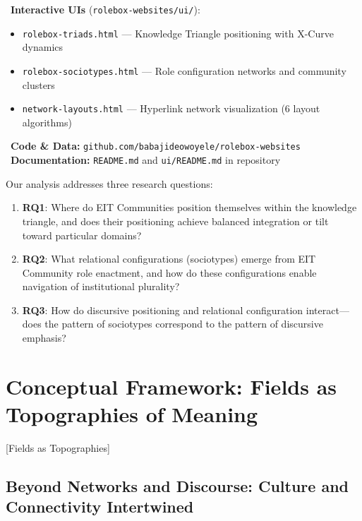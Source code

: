 \documentclass[../main.tex]{subfiles}
\begin{document}
\begin{replicationbox}
\faLaptopCode\ \textbf{Interactive UIs} (\texttt{rolebox-websites/ui/}):
\begin{itemize}[leftmargin=*, itemsep=0.1em]
    \item \texttt{rolebox-triads.html} --- Knowledge Triangle positioning with X-Curve dynamics
    \item \texttt{rolebox-sociotypes.html} --- Role configuration networks and community clusters
    \item \texttt{network-layouts.html} --- Hyperlink network visualization (6 layout algorithms)
\end{itemize}
\faGithub\ \textbf{Code \& Data:} \texttt{github.com/babajideowoyele/rolebox-websites}\\
\faBook\ \textbf{Documentation:} \texttt{README.md} and \texttt{ui/README.md} in repository
\end{replicationbox}

Our analysis addresses three research questions:

\begin{enumerate}
    \item \textbf{RQ1}: Where do EIT Communities position themselves within the knowledge triangle, and does their positioning achieve balanced integration or tilt toward particular domains?
    \item \textbf{RQ2}: What relational configurations (sociotypes) emerge from EIT Community role enactment, and how do these configurations enable navigation of institutional plurality?
    \item \textbf{RQ3}: How do discursive positioning and relational configuration interact---does the pattern of sociotypes correspond to the pattern of discursive emphasis?
\end{enumerate}


\section{Conceptual Framework: Fields as Topographies of Meaning}[Fields as Topographies]

\subsection{Beyond Networks and Discourse: Culture and Connectivity Intertwined}
\end{document}
